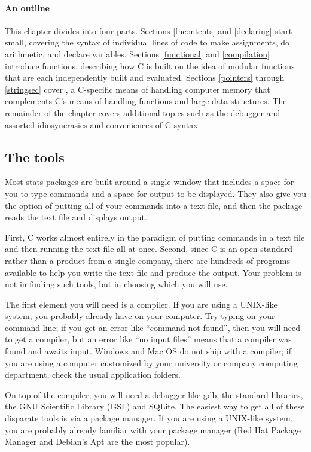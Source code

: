 \documentclass[12pt]{article}
\makeatletter
\def\cind#1{\index{#1@\ci{#1}}\ci{#1}}
\makeatother
\begin{document}
\paragraph{An outline} 

This chapter divides into four parts.
Sections \ref{fncontents} and  \ref{declaring} start small, covering the syntax of individual lines of code to make assignments, do arithmetic, and declare variables.
Sections \ref{functional} and \ref{compilation} introduce functions,
describing how C is built on the idea of modular functions that are
each independently built and evaluated.  Sections \ref{pointers}
through \ref{stringsec} cover
, a C-specific means of handling computer memory that
complements C's means of handling functions and large data structures. The
remainder of the chapter covers additional topics such as the debugger
and assorted idiosyncrasies and conveniences of C syntax.

\subsection{The tools} 
Most stats packages are built around a single window that includes a
space for you to type commands and a space for output to be displayed.
They also give you the option of putting all of your commands into a
text file, and then the package reads the text file and displays output.

First, C works almost entirely in the paradigm of putting commands in a
text file and then running the text file all at once. Second, since
C is an open standard rather than a product from a single company, there
are hundreds of programs available to help you write the text file and
produce the output. Your problem is not in finding such tools, but in
choosing which you will use.

The first element you will need is a compiler. If you are using
a UNIX-like system, you probably already have \cind{gcc} on your
computer. Try typing  on your command line; if you get an
error like ``command not found'', then you will need to get a compiler,
but an error like ``no input files'' means that a compiler was found
and awaits input. Windows and Mac OS do not ship with a compiler; if you
are using a computer customized by your university or company computing
department, check the usual application folders.

On top of the compiler, you will need a debugger like gdb, the standard
libraries, the GNU Scientific Library (GSL) and SQLite.  The easiest
way to get all of these disparate tools is via a package manager. If
you are using a UNIX-like system, you are probably already familiar with
your package manager (Red Hat Package Manager and Debian's Apt are the
most popular).
\end{document}
